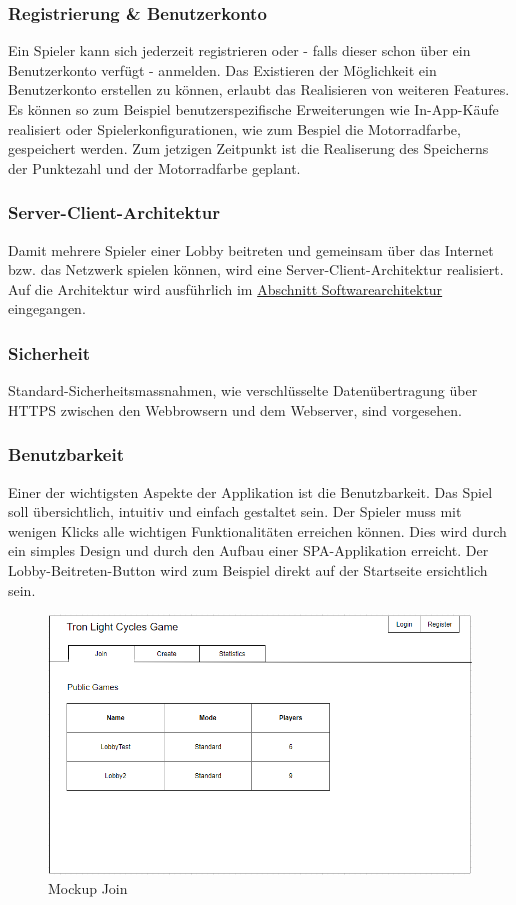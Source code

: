 \documentclass[11pt,ngerman]{article}
\begin{document}
    \subsubsection{Registrierung \& Benutzerkonto}
    Ein Spieler kann sich jederzeit registrieren oder - falls dieser schon über ein Benutzerkonto verfügt - anmelden. Das Existieren der Möglichkeit ein Benutzerkonto erstellen zu können, erlaubt das Realisieren von weiteren Features. Es können so zum Beispiel benutzerspezifische Erweiterungen wie In-App-Käufe realisiert oder Spielerkonfigurationen, wie zum Bespiel die Motorradfarbe, gespeichert werden. Zum jetzigen Zeitpunkt ist die Realiserung des Speicherns der Punktezahl und der Motorradfarbe geplant.
    \subsubsection{Server-Client-Architektur}
    Damit mehrere Spieler einer Lobby beitreten und gemeinsam über das Internet bzw. das Netzwerk spielen können, wird eine Server-Client-Architektur realisiert. Auf die Architektur wird ausführlich im \hyperref[sec:Softwarearchitektur]{Abschnitt Softwarearchitektur} eingegangen.
    \subsubsection{Sicherheit}
    Standard-Sicherheitsmassnahmen, wie verschlüsselte Datenübertragung über \Gls{HTTPS} zwischen den \Gls{Webbrowser}n und dem \Gls{Webserver}, sind vorgesehen.
    \subsubsection{Benutzbarkeit}
    Einer der wichtigsten Aspekte der Applikation ist die Benutzbarkeit. Das Spiel soll übersichtlich, intuitiv und einfach gestaltet sein. Der Spieler muss mit wenigen Klicks alle wichtigen Funktionalitäten erreichen können. Dies wird durch ein simples Design und durch den Aufbau einer \Gls{SPA}-Applikation erreicht. Der \Gls{Lobby}-Beitreten-Button wird zum Beispiel direkt auf der Startseite ersichtlich sein.
    \begin{figure}[H]
    	\centering
    	\includegraphics[scale=0.6]{figures/Mockup_Join.png}
    	\caption{Mockup Join}
    	\label{fig:MockupJoin}
    \end{figure}
\end{document}
